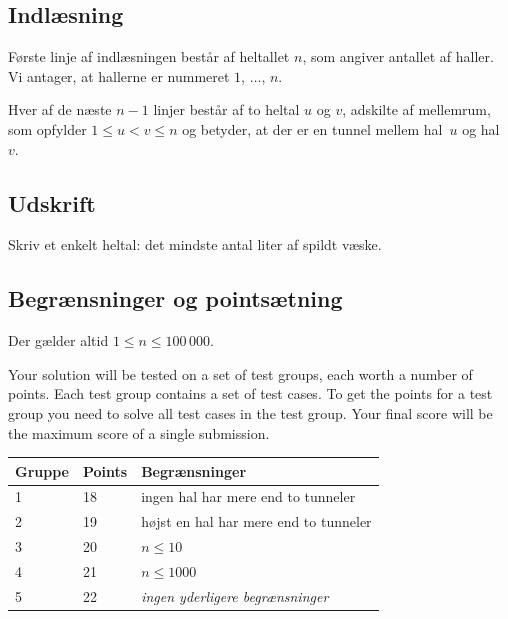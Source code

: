 \subsection*{Indlæsning}

Første linje af indlæsningen består af heltallet $n$, som angiver antallet af haller.
Vi antager, at hallerne er nummeret $1$, $\ldots$, $n$.

Hver af de næste $n-1$ linjer består af to heltal $u$ og $v$, adskilte af mellemrum, som opfylder
$1\leq u < v \leq n$ %
og betyder, at der er en tunnel mellem hal~$u$ og hal~$v$.

\subsection*{Udskrift}

Skriv et enkelt heltal: det mindste antal liter af spildt væske.

\subsection*{Begrænsninger og pointsætning}

Der gælder altid
$1\leq n\leq 100\,000$. %

Your solution will be tested on a set of test groups, each worth a number of points.
Each test group contains a set of test cases.
To get the points for a test group you need to solve all test cases in the test group.
Your final score will be the maximum score of a single submission.

\medskip
\begin{tabular}{lll}
  Gruppe & Points & Begrænsninger \\\hline
  1 & 18 & ingen hal har mere end to tunneler\\
  2 & 19 & højst en hal har mere end to tunneler\\
  3 & 20 & $n\leq 10$\\
  4 & 21 & $n\leq 1000$\\
  5 & 22 & \emph{ingen yderligere begrænsninger}
\end{tabular}
